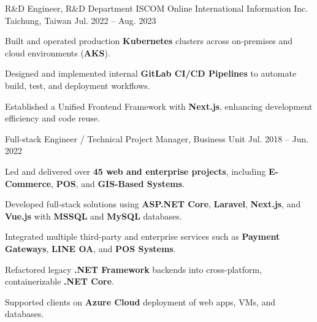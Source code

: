 

\begin{cventries}

  \cventry
  {R\&D Engineer, R\&D Department} %
  {ISCOM Online International Information Inc.} %
  {Taichung, Taiwan} %
  {Jul. 2022 -- Aug. 2023} %
  {
    \begin{cvitems}
      \item {Built and operated production \textbf{Kubernetes} clusters across on-premises and cloud environments (\textbf{AKS}).}
      \item {Designed and implemented internal \textbf{GitLab CI/CD Pipelines} to automate build, test, and deployment workflows.}
      \item {Established a Unified Frontend Framework with \textbf{Next.js}, enhancing development efficiency and code reuse.}
    \end{cvitems}
  }

  \cventry
    {Full-stack Engineer / Technical Project Manager, Business Unit} %
    {} %
    {} %
    {Jul. 2018 -- Jun. 2022} %
    {
      \begin{cvitems}
        \item {Led and delivered over \textbf{45 web and enterprise projects}, including \textbf{E-Commerce}, \textbf{POS}, and \textbf{GIS-Based Systems}.}
        \item {Developed full-stack solutions using \textbf{ASP.NET Core}, \textbf{Laravel}, \textbf{Next.js}, and \textbf{Vue.js} with \textbf{MSSQL} and \textbf{MySQL} databases.}
        \item {Integrated multiple third-party and enterprise services such as \textbf{Payment Gateways}, \textbf{LINE OA}, and \textbf{POS Systems}.}
        \item {Refactored legacy \textbf{.NET Framework} backends into cross-platform, containerizable \textbf{.NET Core}.}
        \item {Supported clients on \textbf{Azure Cloud} deployment of web apps, VMs, and databases.}
      \end{cvitems}
    }


\end{cventries}
